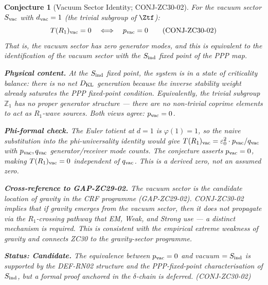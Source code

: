 \documentclass[12pt, a4paper]{article}
\newtheorem{conjecture}{Conjecture}[section]
\begin{document}
\begin{conjecture}[Vacuum Sector Identity; CONJ-ZC30-02]
\label{zc30:conj:vacuum}
For the vacuum sector $S_{\rm vac}$ with $d_{\rm vac} = 1$
(the trivial subgroup of $\Ztf$):
\[
  T(R_1)_{\rm vac} = 0
  \quad\Longleftrightarrow\quad
  p_{\rm vac} = 0
  \tag{CONJ-ZC30-02}\label{zc30:conj:vac}
\]
That is, the vacuum sector has zero generator modes, and
this is \emph{equivalent} to the identification of the vacuum
sector with the $S_{\rm ind}$ fixed point of the PPP map.

\textbf{Physical content.}
At the $S_{\rm ind}$ fixed point, the system is in a state of
criticality balance: there is no net $D_{\rm KL}$ generation
because the inverse stability weight already saturates the
PPP fixed-point condition. Equivalently, the trivial subgroup
$\mathbb{Z}_1$ has no proper generator structure --- there are
no non-trivial coprime elements to act as $R_1$-wave sources.
Both views agree: $p_{\rm vac} = 0$.

\textbf{Phi-formal check.}
The Euler totient at $d = 1$ is $\varphi(1) = 1$, so the naive
substitution into the phi-universality identity would give
$T(R_1)_{\rm vac} = \varepsilon_0^2 \cdot p_{\rm vac}/q_{\rm vac}$
with $p_{\rm vac}, q_{\rm vac}$ generator/receiver mode counts.
The conjecture asserts $p_{\rm vac} = 0$, making $T(R_1)_{\rm vac}
= 0$ independent of $q_{\rm vac}$. This is a derived zero, not
an assumed zero.

\textbf{Cross-reference to GAP-ZC29-02.}
The vacuum sector is the candidate location of gravity in
the CRF programme (GAP-ZC29-02). CONJ-ZC30-02 implies that
\emph{if} gravity emerges from the vacuum sector, then it
does \emph{not} propagate via the $R_1$-crossing pathway
that EM, Weak, and Strong use --- a distinct mechanism is
required. This is consistent with the empirical extreme
weakness of gravity and connects ZC30 to the gravity-sector
programme.

\textbf{Status: Candidate.}
The equivalence between $p_{\rm vac} = 0$ and vacuum $= S_{\rm ind}$
is supported by the DEF-RN02 structure and the
PPP-fixed-point characterisation of $S_{\rm ind}$, but a formal
proof anchored in the $\delta$-chain is deferred.
\hfill\textup{(CONJ-ZC30-02)}
\end{conjecture}
\end{document}
